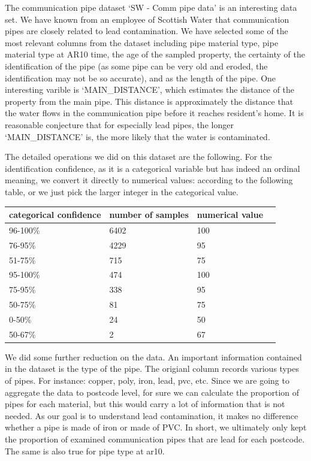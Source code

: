 \documentclass[11pt,twoside]{article}
\numberwithin{Theorem}{section}
\numberwithin{Definition}{section}
\numberwithin{Lemma}{section}
\numberwithin{Algorithm}{section}
\numberwithin{equation}{section}
\begin{document}
The communication pipe dataset `SW - Comm pipe data' is an interesting data set. We have known from an employee of Scottish Water that communication pipes are closely related to lead contamination. We have selected some of the most relevant columns from the dataset including pipe material type, pipe material type at AR10 time, the age of the sampled property, the certainty of the identification of the pipe (as some pipe can be very old and eroded, the identification may not be so accurate), and as the length of the pipe. One interesting varible is `MAIN\_DISTANCE', which estimates the distance of the property from the main pipe. This distance is approximately the distance that the water flows in the communication pipe before it reaches resident's home. It is reasonable conjecture that for especially lead pipes, the longer `MAIN\_DISTANCE' is, the more likely that the water is contaminated.

The detailed operations we did on this dataset are the following. For the identification confidence, as it is a categorical variable but has indeed an ordinal meaning, we convert it directly to numerical values: according to the following table, or we just pick the larger integer in the categorical value.
\begin{center}
    \begin{tabular}{lllc}
        \hline
        categorical confidence  & number of samples & numerical value\\
        \hline
        96-100\%  & 6402   &   100\\
        \hline
        76-95\%   & 4229   &   95\\
        \hline
        51-75\%   &  715   &   75\\
        \hline
        95-100\%  &  474   &   100\\
        \hline
        75-95\%   &  338   &   95\\
        \hline
        50-75\%   &   81   &   75\\
        \hline
        0-50\%    &   24   &   50\\
        \hline
        50-67\%   &    2   &   67\\
        \hline
    \end{tabular}
\end{center}
We did some further reduction on the data. An important information contained in the dataset is the type of the pipe. The origianl column records various types of pipes. For instance: copper, poly, iron, lead, pvc, etc. Since we are going to aggregate the data to postcode level, for sure we can calculate the proportion of pipes for each material, but this would carry a lot of information that is not needed. As our goal is to understand lead contamination, it makes no difference whether a pipe is made of iron or made of PVC. In short, we ultimately only kept the proportion of examined communication pipes that are lead for each postcode. The same is also true for pipe type at ar10.
\end{document}
